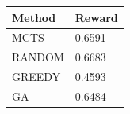 \begin{tabular}{ll}
\hline
Method & Reward \\
\hline
  MCTS & 0.6591 \\
  RANDOM & 0.6683 \\
  GREEDY & 0.4593 \\
  GA & 0.6484 \\
\hline
\end{tabular}
